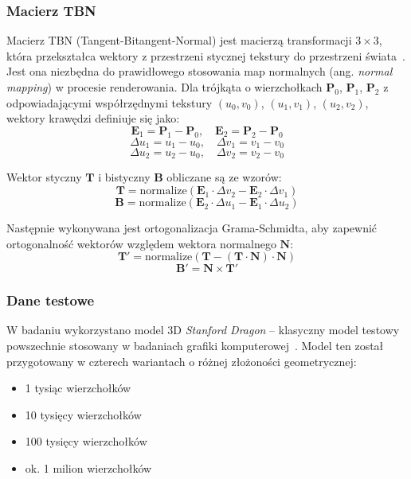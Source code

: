 \subsubsection{Macierz TBN}
Macierz TBN (Tangent-Bitangent-Normal) jest macierzą transformacji $3 \times 3$, która przekształca wektory z przestrzeni stycznej tekstury do przestrzeni świata~\cite{Halladay2019}. Jest ona niezbędna do prawidłowego stosowania map normalnych (ang. \textit{normal mapping}) w procesie renderowania. Dla trójkąta o wierzchołkach $\mathbf{P}_0$, $\mathbf{P}_1$, $\mathbf{P}_2$ z odpowiadającymi współrzędnymi tekstury $(u_0, v_0)$, $(u_1, v_1)$, $(u_2, v_2)$, wektory krawędzi definiuje się jako:
\begin{equation}
  \mathbf{E}_1 = \mathbf{P}_1 - \mathbf{P}_0, \quad \mathbf{E}_2 = \mathbf{P}_2 - \mathbf{P}_0
\end{equation}
\begin{equation}
  \Delta u_1 = u_1 - u_0, \quad \Delta v_1 = v_1 - v_0
\end{equation}
\begin{equation}
  \Delta u_2 = u_2 - u_0, \quad \Delta v_2 = v_2 - v_0
\end{equation}

Wektor styczny $\mathbf{T}$ i bistyczny $\mathbf{B}$ obliczane są ze wzorów:
\begin{equation}
  \mathbf{T} = \mathrm{normalize}(\mathbf{E}_1 \cdot \Delta v_2 - \mathbf{E}_2 \cdot \Delta v_1)
\end{equation}
\begin{equation}
  \mathbf{B} = \mathrm{normalize}(\mathbf{E}_2 \cdot \Delta u_1 - \mathbf{E}_1 \cdot \Delta u_2)
\end{equation}

Następnie wykonywana jest ortogonalizacja Grama-Schmidta, aby zapewnić ortogonalność wektorów względem wektora normalnego $\mathbf{N}$:
\begin{equation}
  \mathbf{T}' = \mathrm{normalize}(\mathbf{T} - (\mathbf{T} \cdot \mathbf{N}) \cdot \mathbf{N})
\end{equation}
\begin{equation}
  \mathbf{B}' = \mathbf{N} \times \mathbf{T}'
\end{equation}

\subsubsection{Dane testowe}
W badaniu wykorzystano model 3D \textit{Stanford Dragon} -- klasyczny model testowy powszechnie stosowany w badaniach grafiki komputerowej~\cite{stanford-dragon}. Model ten został przygotowany w czterech wariantach o różnej złożoności geometrycznej:
\begin{itemize}
  \item 1 tysiąc wierzchołków
  \item 10 tysięcy wierzchołków
  \item 100 tysięcy wierzchołków
  \item ok. 1 milion wierzchołków
\end{itemize}


